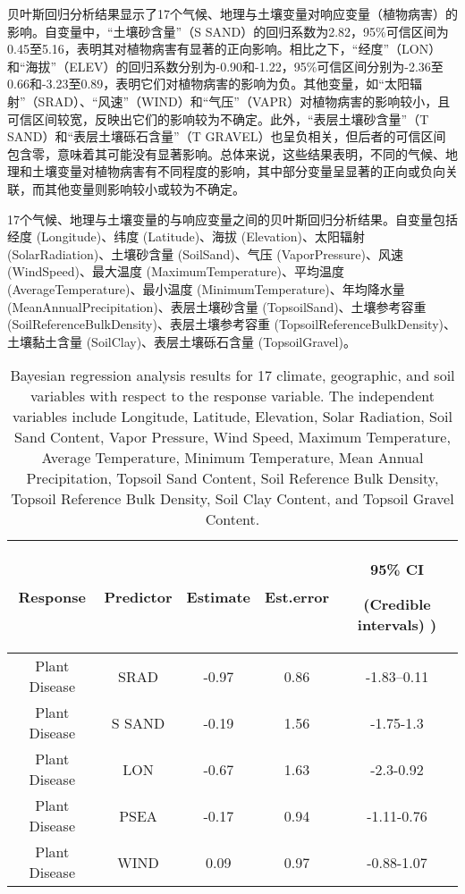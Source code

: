 \documentclass[AutoFakeBold]{LZUThesis-PgD&PhD}
\begin{document}
	贝叶斯回归分析结果显示了17个气候、地理与土壤变量对响应变量（植物病害）的影响。自变量中，“土壤砂含量”（S SAND）的回归系数为2.82，95\%可信区间为0.45至5.16，表明其对植物病害有显著的正向影响。相比之下，“经度”（LON）和“海拔”（ELEV）的回归系数分别为-0.90和-1.22，95\%可信区间分别为-2.36至0.66和-3.23至0.89，表明它们对植物病害的影响为负。其他变量，如“太阳辐射”（SRAD）、“风速”（WIND）和“气压”（VAPR）对植物病害的影响较小，且可信区间较宽，反映出它们的影响较为不确定。此外，“表层土壤砂含量”（T SAND）和“表层土壤砾石含量”（T GRAVEL）也呈负相关，但后者的可信区间包含零，意味着其可能没有显著影响。总体来说，这些结果表明，不同的气候、地理和土壤变量对植物病害有不同程度的影响，其中部分变量呈显著的正向或负向关联，而其他变量则影响较小或较为不确定。
	
	
	\begin{table}[H]
		\centering
		\caption{17个气候、地理与土壤变量的与响应变量之间的贝叶斯回归分析结果。自变量包括经度 (Longitude)、纬度 (Latitude)、海拔 (Elevation)、太阳辐射 (SolarRadiation)、土壤砂含量 (SoilSand)、气压 (VaporPressure)、风速 (WindSpeed)、最大温度 (MaximumTemperature)、平均温度 (AverageTemperature)、最小温度 (MinimumTemperature)、年均降水量 (MeanAnnualPrecipitation)、表层土壤砂含量 (TopsoilSand)、土壤参考容重 (SoilReferenceBulkDensity)、表层土壤参考容重 (TopsoilReferenceBulkDensity)、土壤黏土含量 (SoilClay)、表层土壤砾石含量 (TopsoilGravel)。}
		\caption*{Bayesian regression analysis results for 17 climate, geographic, and soil variables with respect to the response variable. The independent variables include Longitude, Latitude, Elevation, Solar Radiation, Soil Sand Content, Vapor Pressure, Wind Speed, Maximum Temperature, Average Temperature, Minimum Temperature, Mean Annual Precipitation, Topsoil Sand Content, Soil Reference Bulk Density, Topsoil Reference Bulk Density, Soil Clay Content, and Topsoil Gravel Content.}
		\begin{tabular}{ccccc}
			\hline
			Response & Predictor & Estimate & Est.error & 95\% CI \par (Credible intervals) ) \\ 
			\hline
			Plant Disease & SRAD & -0.97 & 0.86 & -1.83--0.11 \\ 
			Plant Disease & S SAND & -0.19 & 1.56 & -1.75-1.3 \\ 
			Plant Disease & LON & -0.67 & 1.63 & -2.3-0.92 \\ 
			Plant Disease & PSEA & -0.17 & 0.94 & -1.11-0.76 \\ 
			Plant Disease & WIND & 0.09 & 0.97 & -0.88-1.07 \\ 

\end{tabular}
\end{table}
\end{document}
